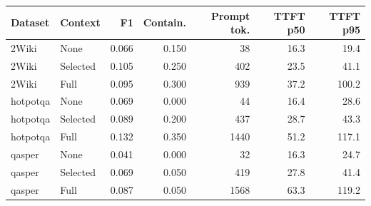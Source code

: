 \begin{tabular}{llrrrrr}
\toprule
Dataset & Context & F1 & Contain. & Prompt tok. & TTFT p50 & TTFT p95 \\
\midrule
2Wiki & None & 0.066 & 0.150 & 38 & 16.3 & 19.4 \\
2Wiki & Selected & 0.105 & 0.250 & 402 & 23.5 & 41.1 \\
2Wiki & Full & 0.095 & 0.300 & 939 & 37.2 & 100.2 \\
hotpotqa & None & 0.069 & 0.000 & 44 & 16.4 & 28.6 \\
hotpotqa & Selected & 0.089 & 0.200 & 437 & 28.7 & 43.3 \\
hotpotqa & Full & 0.132 & 0.350 & 1440 & 51.2 & 117.1 \\
qasper & None & 0.041 & 0.000 & 32 & 16.3 & 24.7 \\
qasper & Selected & 0.069 & 0.050 & 419 & 27.8 & 41.4 \\
qasper & Full & 0.087 & 0.050 & 1568 & 63.3 & 119.2 \\
\bottomrule
\end{tabular}
